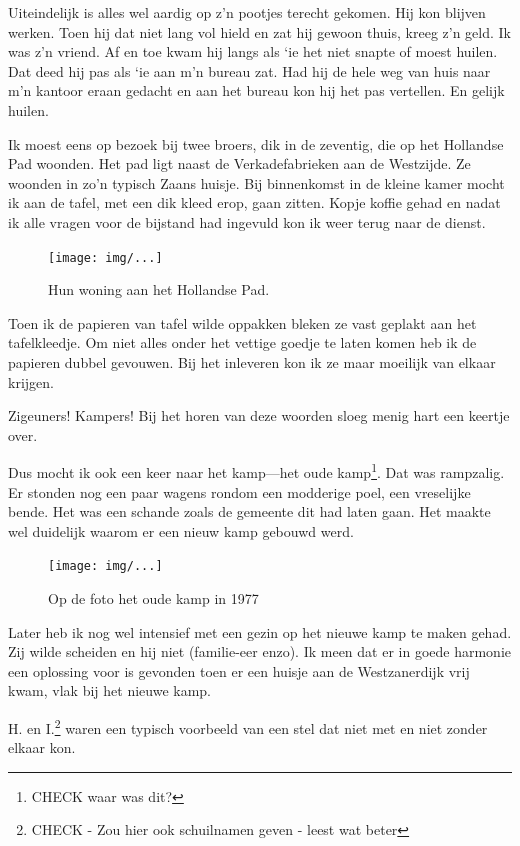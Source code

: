 \documentclass[12pt,twoside, openright]{memoir}
\begin{document}
Uiteindelijk is alles wel aardig op z’n pootjes terecht gekomen. Hij kon blijven werken. Toen hij dat niet lang vol hield en zat hij gewoon thuis, kreeg z’n geld. Ik was z’n vriend. Af en toe kwam hij langs als `ie het niet snapte of moest huilen. Dat deed hij pas als `ie aan m’n bureau zat. Had hij de hele weg van huis naar m’n kantoor eraan gedacht en aan het bureau kon hij het pas vertellen. En gelijk huilen.

Ik moest eens op bezoek bij twee broers, dik in de zeventig, die op het Hollandse Pad woonden. Het pad ligt naast de Verkadefabrieken aan de Westzijde. Ze woonden in zo’n typisch Zaans huisje. Bij binnenkomst in de kleine kamer mocht ik aan de tafel, met een dik kleed erop, gaan zitten. Kopje koffie gehad en nadat ik alle vragen voor de bijstand had ingevuld kon ik weer terug naar de dienst. 

\begin{figure}[t]
\texttt{[image: img/...]}
\caption{Hun woning aan het Hollandse Pad.}
\end{figure}

Toen ik de papieren van tafel wilde oppakken bleken ze vast geplakt aan het tafelkleedje. Om niet alles onder het vettige goedje te laten komen heb ik de papieren dubbel gevouwen. Bij het inleveren kon ik ze maar moeilijk van elkaar krijgen.	

Zigeuners! Kampers! Bij het horen van deze woorden sloeg menig hart een keertje over. 

Dus mocht ik ook een keer naar het kamp---het oude kamp\footnote{CHECK waar was dit?}. Dat was rampzalig. Er stonden nog een paar wagens rondom een modderige poel, een vreselijke bende. Het was een schande zoals de gemeente dit had laten gaan. Het maakte wel duidelijk waarom er een nieuw kamp gebouwd werd. 

\begin{figure}[t]
\texttt{[image: img/...]}
\caption{Op de foto het oude kamp in 1977}
\end{figure}

Later heb ik nog wel intensief met een gezin op het nieuwe kamp te maken gehad. Zij wilde scheiden en hij niet (familie-eer enzo). Ik meen dat er in goede harmonie een oplossing voor is gevonden toen er een huisje aan de Westzanerdijk vrij kwam, vlak bij het nieuwe kamp. 

H. en I.\footnote{CHECK - Zou hier ook schuilnamen geven - leest wat beter} waren een typisch voorbeeld van een stel dat niet met en niet zonder elkaar kon. 
\end{document}
